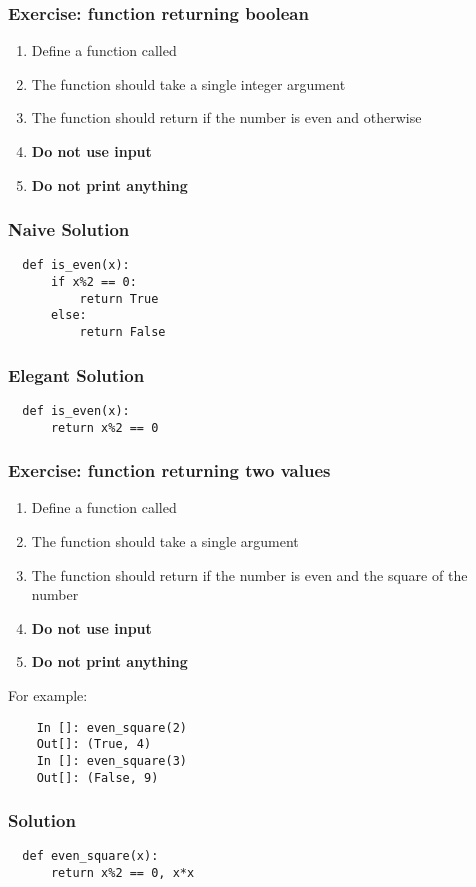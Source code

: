 \documentclass[14pt,compress]{beamer}
\begin{document}
\begin{frame}[plain]
  \frametitle{Exercise: function returning boolean}
  \begin{enumerate}
  \item Define a function called 
  \item The function should take a single integer argument
  \item The function should return  if the number is even and  otherwise
  \item \textbf{Do not use input}
  \item \textbf{Do not print anything}
  \end{enumerate}
\end{frame}

\begin{frame}
\frametitle{Naive Solution}
\begin{lstlisting}
  def is_even(x):
      if x%2 == 0:
          return True
      else:
          return False
\end{lstlisting}
\end{frame}

\begin{frame}
\frametitle{Elegant Solution}
\begin{lstlisting}
  def is_even(x):
      return x%2 == 0
\end{lstlisting}
\end{frame}

\begin{frame}
  \frametitle{Exercise: function returning two values}
  \begin{enumerate}
  \item Define a function called 
  \item The function should take a single argument
  \item The function should return if the number is even and the square of the number
  \item \textbf{Do not use input}
  \item \textbf{Do not print anything}
  \end{enumerate}
  For example:
  \begin{lstlisting}
    In []: even_square(2)
    Out[]: (True, 4)
    In []: even_square(3)
    Out[]: (False, 9)
  \end{lstlisting}
\end{frame}

\begin{frame}
  \frametitle{Solution}
  \begin{lstlisting}
  def even_square(x):
      return x%2 == 0, x*x
    \end{lstlisting}
\end{frame}
\end{document}
